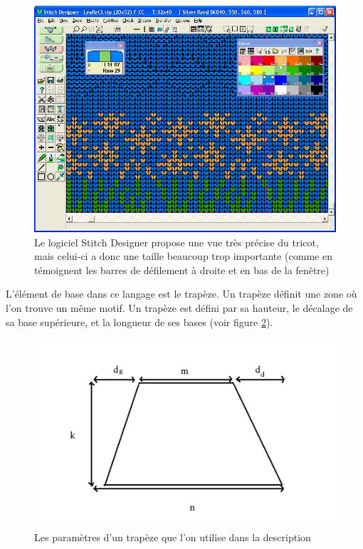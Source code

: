 \documentclass{article}
\begin{document}
\begin{figure}[!ht]
  \centering
  \includegraphics[scale=0.3]{../img/grid.jpg}
  \caption{Le logiciel Stitch Designer propose une vue très précise du tricot, mais celui-ci a donc une taille beaucoup trop importante (comme en témoignent les barres de défilement à droite et en bas de la fenêtre)}
  \label{logiciel}
\end{figure}

L'élément de base dans ce langage est le trapèze. Un trapèze définit une zone où l'on trouve un même motif. Un trapèze est défini par sa hauteur, le décalage de sa base supérieure, et la longueur de ses bases (voir figure \ref{trapeze}).

\begin{figure}[!ht]
  \centering
  \includegraphics[scale=0.5]{../img/trapeze.jpg}
  \caption{Les paramètres d'un trapèze que l'on utilise dans la description}
  \label{trapeze}
\end{figure}
\end{document}
